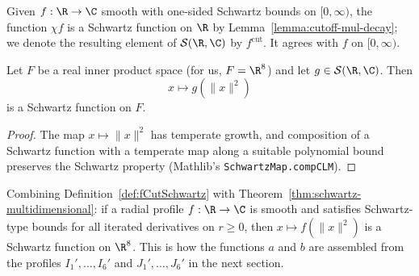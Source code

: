 \begin{definition}\label{def:fCutSchwartz}\leanok
  Given $f : \R \to \C$ smooth with one-sided Schwartz bounds on $[0, \infty)$, the function
  $\chi f$ is a Schwartz function on $\R$ by Lemma~\ref{lemma:cutoff-mul-decay}; we denote the
  resulting element of $\mathcal{S}(\R, \C)$ by $f^{\mathrm{cut}}$. It agrees with $f$ on
  $[0, \infty)$.
\end{definition}

\begin{theorem}\label{thm:schwartz-multidimensional}\leanok
  Let $F$ be a real inner product space (for us, $F = \R^8$) and let
  $g \in \mathcal{S}(\R, \C)$. Then
  \[
    x \mapsto g(\|x\|^2)
  \]
  is a Schwartz function on $F$.
\end{theorem}
\begin{proof}\leanok
  The map $x \mapsto \|x\|^2$ has temperate growth, and composition of a Schwartz function with a
  temperate map along a suitable polynomial bound preserves the Schwartz property (Mathlib's
  \texttt{SchwartzMap.compCLM}).
\end{proof}

Combining Definition~\ref{def:fCutSchwartz} with Theorem~\ref{thm:schwartz-multidimensional}: if
a radial profile $f : \R \to \C$ is smooth and satisfies Schwartz-type bounds for all iterated
derivatives on $r \ge 0$, then $x \mapsto f(\|x\|^2)$ is a Schwartz function on $\R^8$. This is
how the functions $a$ and $b$ are assembled from the profiles $I_1', \dots, I_6'$ and
$J_1', \dots, J_6'$ in the next section.
